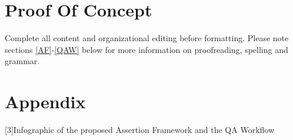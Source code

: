 \documentclass[conference]{IEEEtran}
\begin{document}
\section{Proof Of Concept}

Complete all content and organizational editing before 
formatting. Please note sections \ref{AF}-\ref{QAW} below for more information on 
proofreading, spelling and grammar.




\section*{Appendix}

\noindent\footnotesize{[3]\hspace{0.5em}Infographic of the proposed Assertion Framework and the QA Workflow}
\end{document}
